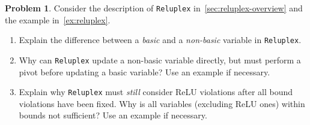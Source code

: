 \documentclass[oneside,11pt,dvipsnames]{book}
\numberwithin{equation}{section}
\theoremstyle{definition}
\newtheorem{problem}{Problem}[section]
\theoremstyle{remark}
\newcommand{\reluplex}{\texttt{Reluplex}}
\begin{document}



\begin{problem}\label{problem:reluplex-basic-nonbasic}
  Consider the description of \reluplex{} in~\autoref{sec:reluplex-overview} and the example in~\autoref{ex:reluplex}.

  \begin{enumerate}
    \item Explain the difference between a \emph{basic} and a \emph{non-basic} variable in \reluplex{}.
    \item Why can \reluplex{} update a non-basic variable directly, but must perform a pivot before updating a basic variable? Use an example if necessary.
    \item Explain why \reluplex{} must \emph{still} consider ReLU violations after all bound violations have been fixed.  Why is all variables (excluding ReLU ones) within bounds not sufficient? Use an example if necessary.
   \end{enumerate}
\end{problem}





\end{document}
